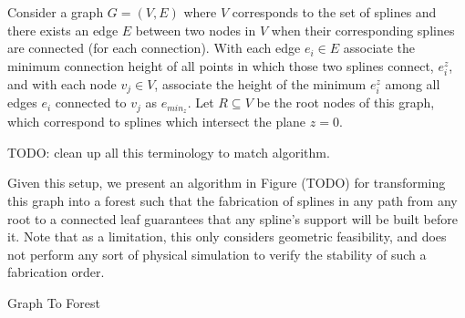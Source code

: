 \documentclass[conference]{acmsiggraph}
\makeatletter
\def\BState{\State\hskip-\ALG@thistlm}
\makeatother
\begin{document}
Consider a graph $G = (V, E)$ where $V$ corresponds to the set of splines and there exists an edge $E$ between two nodes in $V$ when their corresponding splines are connected (for each connection).  With each edge $e_i \in E$ associate the minimum connection height of all points in which those two splines connect, $e_i^z$, and with each node $v_j \in V$, associate the height of the minimum $e_i^z$ among all edges $e_i$ connected to $v_j$ as $e_{min_z}$.  Let $R \subseteq V$ be the root nodes of this graph, which correspond to splines which intersect the plane $z=0$.

TODO: clean up all this terminology to match algorithm.

Given this setup, we present an algorithm in Figure (TODO) for transforming this graph into a forest such that the fabrication of splines in any path from any root to a connected leaf guarantees that any spline's support will be built before it.  Note that as a limitation, this only considers geometric feasibility, and does not perform any sort of physical simulation to verify the stability of such a fabrication order.

\begin{algorithm}
\caption{Graph To Forest}\label{alg:graphtoforest}
\end{algorithm}
\end{document}
